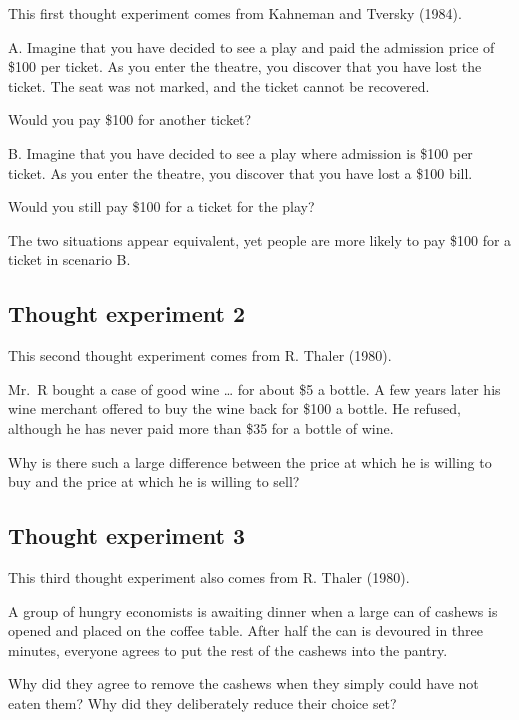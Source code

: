 \documentclass[
  letterpaper,
  DIV=11,
  numbers=noendperiod]{scrreprt}
\begin{document}
This first thought experiment comes from Kahneman and Tversky (1984).

A. Imagine that you have decided to see a play and paid the admission
price of \$100 per ticket. As you enter the theatre, you discover that
you have lost the ticket. The seat was not marked, and the ticket cannot
be recovered.

Would you pay \$100 for another ticket?

B. Imagine that you have decided to see a play where admission is \$100
per ticket. As you enter the theatre, you discover that you have lost a
\$100 bill.

Would you still pay \$100 for a ticket for the play?

The two situations appear equivalent, yet people are more likely to pay
\$100 for a ticket in scenario B.

\hypertarget{thought-experiment-2}{%
\subsection*{Thought experiment 2}\label{thought-experiment-2}}

This second thought experiment comes from R. Thaler (1980).

Mr.~R bought a case of good wine \ldots{} for about \$5 a bottle. A few
years later his wine merchant offered to buy the wine back for \$100 a
bottle. He refused, although he has never paid more than \$35 for a
bottle of wine.

Why is there such a large difference between the price at which he is
willing to buy and the price at which he is willing to sell?

\hypertarget{thought-experiment-3}{%
\subsection*{Thought experiment 3}\label{thought-experiment-3}}

This third thought experiment also comes from R. Thaler (1980).

A group of hungry economists is awaiting dinner when a large can of
cashews is opened and placed on the coffee table. After half the can is
devoured in three minutes, everyone agrees to put the rest of the
cashews into the pantry.

Why did they agree to remove the cashews when they simply could have not
eaten them? Why did they deliberately reduce their choice set?
\end{document}
